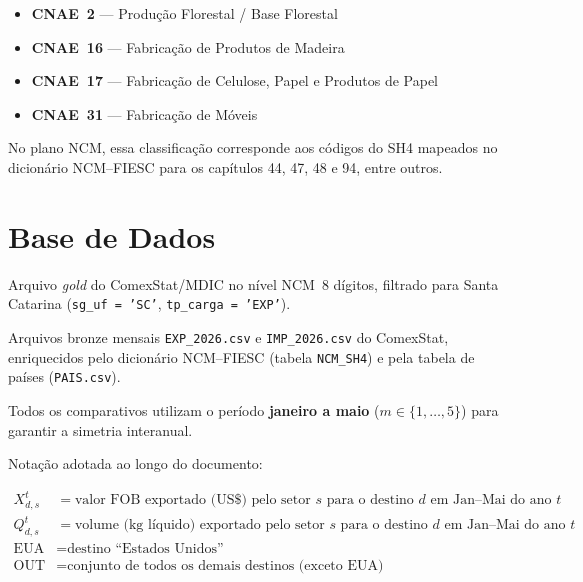 \documentclass[12pt, a4paper]{article}
\begin{document}
\begin{itemize}[noitemsep]
  \item \textbf{CNAE~2} — Produção Florestal / Base Florestal
  \item \textbf{CNAE~16} — Fabricação de Produtos de Madeira
  \item \textbf{CNAE~17} — Fabricação de Celulose, Papel e Produtos de Papel
  \item \textbf{CNAE~31} — Fabricação de Móveis
\end{itemize}

No plano NCM, essa classificação corresponde aos códigos do SH4 mapeados
no dicionário NCM--FIESC para os capítulos 44, 47, 48 e 94, entre outros.

\section{Base de Dados}

\begin{description}[style=nextline]
  \item[Exportações históricas (2024--2025)]
    Arquivo \textit{gold} do ComexStat/MDIC no nível NCM~8 dígitos,
    filtrado para Santa Catarina
    (\texttt{sg\_uf = 'SC'}, \texttt{tp\_carga = 'EXP'}).
  \item[Exportações e importações 2026 (jan--mai)]
    Arquivos bronze mensais \texttt{EXP\_2026.csv} e \texttt{IMP\_2026.csv}
    do ComexStat, enriquecidos pelo dicionário NCM--FIESC
    (tabela \texttt{NCM\_SH4}) e pela tabela de países (\texttt{PAIS.csv}).
  \item[Referência temporal]
    Todos os comparativos utilizam o período \textbf{janeiro a maio}
    (\(m \in \{1,\dots,5\}\)) para garantir a simetria interanual.
\end{description}

Notação adotada ao longo do documento:

\begin{align*}
  X_{d,s}^{t} &= \text{valor FOB exportado (US\$) pelo setor } s
                  \text{ para o destino } d \text{ em Jan--Mai do ano } t\\
  Q_{d,s}^{t} &= \text{volume (kg líquido) exportado pelo setor } s
                  \text{ para o destino } d \text{ em Jan--Mai do ano } t\\
  \text{EUA}  &= \text{destino ``Estados Unidos''}\\
  \text{OUT}  &= \text{conjunto de todos os demais destinos (exceto EUA)}
\end{align*}
\end{document}
